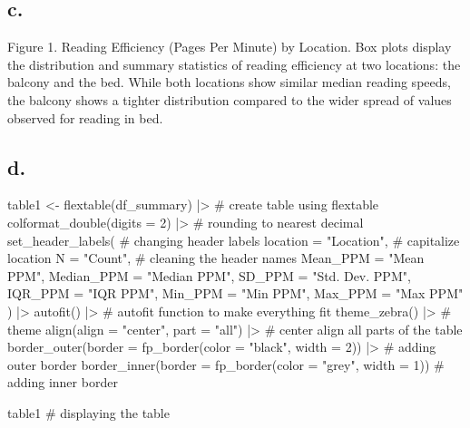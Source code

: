 \documentclass[
  letterpaper,
  DIV=11,
  numbers=noendperiod]{scrartcl}
\newenvironment{Shaded}{\begin{snugshade}}{\end{snugshade}}
\newcommand{\AttributeTok}[1]{\textcolor[rgb]{0.40,0.45,0.13}{#1}}
\newcommand{\CommentTok}[1]{\textcolor[rgb]{0.37,0.37,0.37}{#1}}
\newcommand{\DecValTok}[1]{\textcolor[rgb]{0.68,0.00,0.00}{#1}}
\newcommand{\FunctionTok}[1]{\textcolor[rgb]{0.28,0.35,0.67}{#1}}
\newcommand{\NormalTok}[1]{\textcolor[rgb]{0.00,0.23,0.31}{#1}}
\newcommand{\OtherTok}[1]{\textcolor[rgb]{0.00,0.23,0.31}{#1}}
\newcommand{\SpecialCharTok}[1]{\textcolor[rgb]{0.37,0.37,0.37}{#1}}
\newcommand{\StringTok}[1]{\textcolor[rgb]{0.13,0.47,0.30}{#1}}
\begin{document}
\subsection{c.}\label{c.}

Figure 1. Reading Efficiency (Pages Per Minute) by Location. Box plots
display the distribution and summary statistics of reading efficiency at
two locations: the balcony and the bed. While both locations show
similar median reading speeds, the balcony shows a tighter distribution
compared to the wider spread of values observed for reading in bed.

\subsection{d.}\label{d.}

\begin{Shaded}
\begin{Highlighting}[]
\NormalTok{table1 }\OtherTok{\textless{}{-}} \FunctionTok{flextable}\NormalTok{(df\_summary) }\SpecialCharTok{|\textgreater{}} \CommentTok{\# create table using flextable}
  \FunctionTok{colformat\_double}\NormalTok{(}\AttributeTok{digits =} \DecValTok{2}\NormalTok{) }\SpecialCharTok{|\textgreater{}} \CommentTok{\# rounding to nearest decimal}
  \FunctionTok{set\_header\_labels}\NormalTok{( }\CommentTok{\# changing header labels}
    \AttributeTok{location =} \StringTok{"Location"}\NormalTok{, }\CommentTok{\# capitalize location}
    \AttributeTok{N =} \StringTok{"Count"}\NormalTok{, }\CommentTok{\# cleaning the header names}
    \AttributeTok{Mean\_PPM =} \StringTok{"Mean PPM"}\NormalTok{,}
    \AttributeTok{Median\_PPM =} \StringTok{"Median PPM"}\NormalTok{,}
    \AttributeTok{SD\_PPM =} \StringTok{"Std. Dev. PPM"}\NormalTok{,}
    \AttributeTok{IQR\_PPM =} \StringTok{"IQR PPM"}\NormalTok{,}
    \AttributeTok{Min\_PPM =} \StringTok{"Min PPM"}\NormalTok{,}
    \AttributeTok{Max\_PPM =} \StringTok{"Max PPM"}
\NormalTok{  ) }\SpecialCharTok{|\textgreater{}}
  \FunctionTok{autofit}\NormalTok{() }\SpecialCharTok{|\textgreater{}} \CommentTok{\# autofit function to make everything fit}
  \FunctionTok{theme\_zebra}\NormalTok{() }\SpecialCharTok{|\textgreater{}} \CommentTok{\# theme}
  \FunctionTok{align}\NormalTok{(}\AttributeTok{align =} \StringTok{"center"}\NormalTok{, }\AttributeTok{part =} \StringTok{"all"}\NormalTok{) }\SpecialCharTok{|\textgreater{}} \CommentTok{\# center align all parts of the table}
  \FunctionTok{border\_outer}\NormalTok{(}\AttributeTok{border =} \FunctionTok{fp\_border}\NormalTok{(}\AttributeTok{color =} \StringTok{"black"}\NormalTok{, }\AttributeTok{width =} \DecValTok{2}\NormalTok{)) }\SpecialCharTok{|\textgreater{}} \CommentTok{\# adding outer border}
  \FunctionTok{border\_inner}\NormalTok{(}\AttributeTok{border =} \FunctionTok{fp\_border}\NormalTok{(}\AttributeTok{color =} \StringTok{"grey"}\NormalTok{, }\AttributeTok{width =} \DecValTok{1}\NormalTok{)) }\CommentTok{\# adding inner border}

\NormalTok{table1 }\CommentTok{\# displaying the table}
\end{Highlighting}
\end{Shaded}
\end{document}
